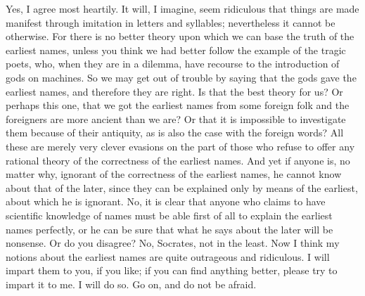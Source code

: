 {{{{{\hermogenesspeaks
Yes, I agree most heartily. 
\socratesspeaks
It will, I imagine, seem ridiculous that things are made manifest through imitation in letters and syllables; nevertheless it cannot be otherwise. For there is no better theory upon which we can base the truth of the earliest names, unless you think we had better follow the example of the tragic poets, who, when they are in a dilemma, have recourse to the introduction of gods on machines. So we may get out of trouble by saying that the gods gave the earliest names, and therefore they are right.  Is that the best theory for us? Or perhaps this one, that we got the earliest names from some foreign folk and the foreigners are more ancient than we are? Or that it is impossible to investigate them because of their antiquity, as is also the case with the foreign words?  All these are merely very clever evasions on the part of those who refuse to offer any rational theory of the correctness of the earliest names. And yet if anyone is, no matter why, ignorant of the correctness of the earliest names, he cannot know about that of the later, since they can be explained only by means of the earliest, about which he is ignorant. No, it is clear that anyone who claims to have scientific knowledge of names must be able first of all to explain the earliest names perfectly,  or he can be sure that what he says about the later will be nonsense. Or do you disagree?
\hermogenesspeaks
No, Socrates, not in the least.
\socratesspeaks
Now I think my notions about the earliest names are quite outrageous and ridiculous. I will impart them to you, if you like; if you can find anything better, please try to impart it to me.
\hermogenesspeaks
I will do so. Go on, and do not be afraid. 
\socratesspeaks
}}}}}
